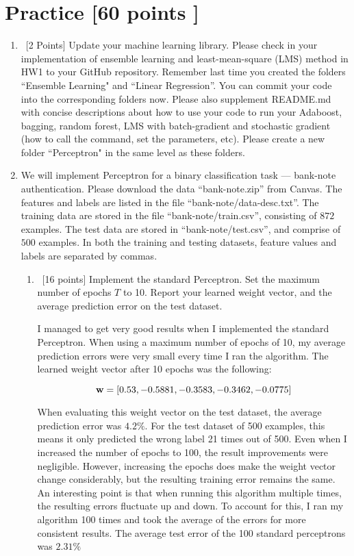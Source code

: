 \documentclass[12pt, fullpage,letterpaper]{article}
\begin{document}
\section{Practice [60 points ]}
\begin{enumerate}
	\item~[2 Points] Update your machine learning library. Please check in your implementation of ensemble learning and least-mean-square (LMS) method in HW1 to your GitHub repository. Remember last time you created the folders ``Ensemble Learning" and ``Linear Regression''. You can commit your code into the corresponding folders now. Please also supplement README.md with concise descriptions about how to use your code to run your Adaboost, bagging, random forest, LMS with batch-gradient and stochastic gradient (how to call the command, set the parameters, etc). Please create a new folder ``Perceptron" in the same level as these folders.  

\item We will implement  Perceptron for a binary classification task --- bank-note authentication. Please download the data ``bank-note.zip'' from Canvas. The features and labels are listed in the file ``bank-note/data-desc.txt''. The training data are stored in the file ``bank-note/train.csv'', consisting of $872$ examples. The test data are stored in ``bank-note/test.csv'', and comprise of $500$ examples. In both the training and testing datasets, feature values and labels are separated by commas. 
\begin{enumerate}
	\item~[16 points] Implement the standard Perceptron. Set the maximum number of epochs $T$ to 10. Report your learned weight vector, and the average prediction error on the test dataset. 
	
	I managed to get very good results when I implemented the standard Perceptron. When using a maximum number of epochs of 10, my average prediction errors were very small every time I ran the algorithm. The learned weight vector after 10 epochs was the following:
	
	\[
		{\bf w} = [0.53, -0.5881, -0.3583, -0.3462, -0.0775]
	\]
	
	When evaluating this weight vector on the test dataset, the average prediction error was $4.2\%$. For the test dataset of 500 examples, this means it only predicted the wrong label 21 times out of 500. Even when I increased the number of epochs to 100, the result improvements were negligible. However, increasing the epochs does make the weight vector change considerably, but the resulting training error remains the same. An interesting point is that when running this algorithm multiple times, the resulting errors fluctuate up and down. To account for this, I ran my algorithm 100 times and took the average of the errors for more consistent results. The average test error of the 100 standard perceptrons was $2.31\%$ 
	

\end{enumerate}
\end{enumerate}
\end{document}
